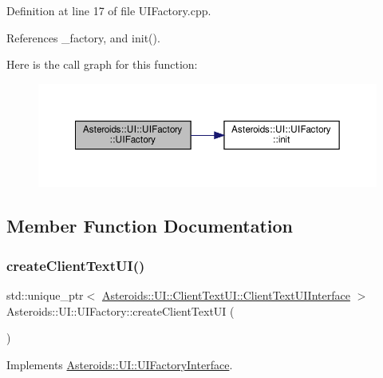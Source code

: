 Definition at line 17 of file U\+I\+Factory.\+cpp.



References \+\_\+factory, and init().

Here is the call graph for this function\+:\nopagebreak
\begin{figure}[H]
\begin{center}
\leavevmode
\includegraphics[width=350pt]{classAsteroids_1_1UI_1_1UIFactory_a47523bac4da1426badfd2dec54da7779_cgraph}
\end{center}
\end{figure}


\subsection{Member Function Documentation}
\mbox{\label{classAsteroids_1_1UI_1_1UIFactory_ac9a90bd87ef42d1b1af6ef9ff597aa28}} 
\subsubsection{\texorpdfstring{create\+Client\+Text\+U\+I()}{createClientTextUI()}}
{\footnotesize\ttfamily std\+::unique\+\_\+ptr$<$ \hyperlink{classAsteroids_1_1UI_1_1ClientTextUI_1_1ClientTextUIInterface}{Asteroids\+::\+U\+I\+::\+Client\+Text\+U\+I\+::\+Client\+Text\+U\+I\+Interface} $>$ Asteroids\+::\+U\+I\+::\+U\+I\+Factory\+::create\+Client\+Text\+UI (\begin{DoxyParamCaption}{ }\end{DoxyParamCaption})\hspace{0.3cm}{\ttfamily [virtual]}}



Implements \hyperlink{classAsteroids_1_1UI_1_1UIFactoryInterface_a6133ee6b7552c1f218df3e51aed91c74}{Asteroids\+::\+U\+I\+::\+U\+I\+Factory\+Interface}.



